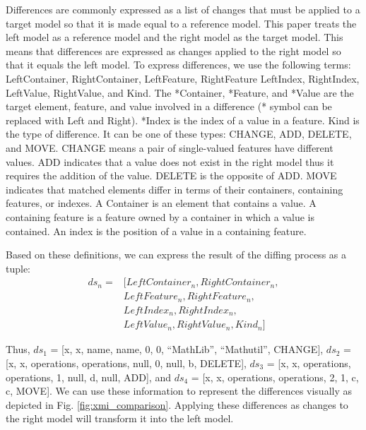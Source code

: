 Differences are commonly expressed as a list of changes that must be applied to a target model so that it is made equal to a reference model.
This paper treats the left model as a reference model and the right model as the target model.
This means that differences are expressed as changes applied to the right model so that it equals the left model.
To express differences, we use the following terms: \textsf{LeftContainer}, \textsf{RightContainer}, \textsf{LeftFeature}, \textsf{RightFeature} \textsf{LeftIndex}, \textsf{RightIndex}, \textsf{LeftValue}, \textsf{RightValue}, and \textsf{Kind}. The \textsf{*Container}, \textsf{*Feature}, and \textsf{*Value} are the target element, feature, and value involved in a difference (\textsf{*} symbol can be replaced with \textsf{Left} and \textsf{Right}). \textsf{*Index} is the index of a value in a feature. \textsf{Kind} is the type of difference. It can be one of these types: \textsf{CHANGE}, \textsf{ADD}, \textsf{DELETE}, and \textsf{MOVE}. \textsf{CHANGE} means a pair of single-valued features 
have different values. \textsf{ADD} indicates that a value does not exist in the right model thus it requires the addition of the value. \textsf{DELETE} is the opposite
of \textsf{ADD}. \textsf{MOVE} indicates that matched elements differ in terms of their containers, containing features, or indexes.
A Container is an element that contains a value. A containing feature is a feature owned by a container in which a value is contained. An index is the position of a value in a containing feature.

Based on these definitions, we can express the result of the diffing process as a tuple:
\begin{equation} \label{eq:diff_definition}
\begin{split}
ds_{n} = &[LeftContainer_n, RightContainer_n,\\
&LeftFeature_n, RightFeature_n,\\
&LeftIndex_n, RightIndex_n,\\
&LeftValue_n, RightValue_n, Kind_n]
\end{split}
\end{equation}

Thus, $ds_{1}$ =  [\textsf{x}, \textsf{x}, \textsf{name}, \textsf{name}, 0, 0, ``MathLib'', ``Mathutil'', \textsf{CHANGE}], $ds_{2}$ = [\textsf{x}, \textsf{x}, \textsf{operations}, \textsf{operations}, null, 0, null, \textsf{b}, \textsf{DELETE}], $ds_{3}$ = [\textsf{x}, \textsf{x}, \textsf{operations}, \textsf{operations}, 1, null, \textsf{d}, null, \textsf{ADD}], and $ds_{4}$ = [\textsf{x}, \textsf{x}, \textsf{operations}, \textsf{operations}, 2, 1, \textsf{c}, \textsf{c}, \textsf{MOVE}]. We can use these information to represent the differences visually as depicted in Fig. \ref{fig:xmi_comparison}. Applying these differences as changes to the right model will transform it into the left model.  

